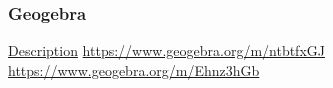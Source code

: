 \documentclass{beamer}
\begin{document}
\begin{frame}[fragile]
\frametitle{Geogebra}

\begin{extract}
\href{https://www.geogebra.org/m/ydz69yUz}{Description}
\url{https://www.geogebra.org/m/ntbtfxGJ}
\url{https://www.geogebra.org/m/Ehnz3hGb}
\end{extract}

\end{frame}
\end{document}
